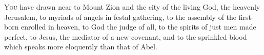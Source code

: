 \lettrine[lines=3,loversize=0.15]{Y}{ou} have drawn near to Mount Zion and the city of the living God, the heavenly Jerusalem, to myriads of angels in festal gathering, to the assembly of the first-born enrolled in heaven, to God the judge of all, to the spirits of just men made perfect, to Jesus, the mediator of a new covenant, and to the sprinkled blood which speaks more eloquently than that of Abel.
